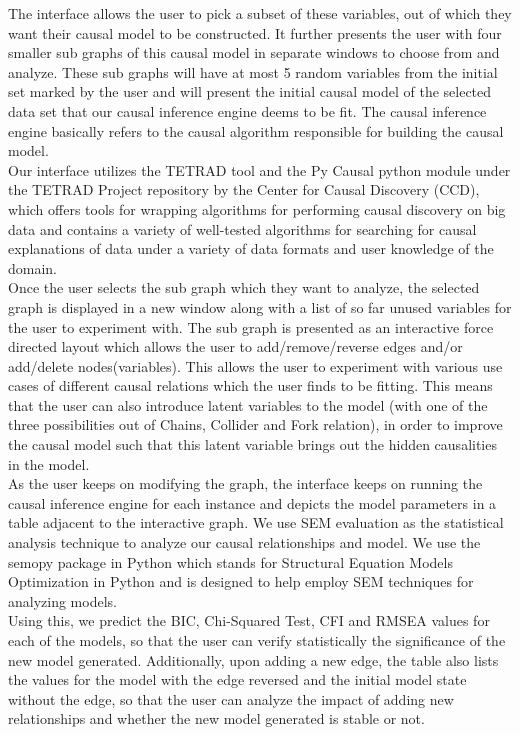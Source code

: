 \documentclass{vgtc}                          %
\begin{document}
The interface allows the user to pick a subset of these variables, out of which they want their causal model to be constructed. It further presents the user with four smaller sub graphs of this causal model in separate windows to choose from and analyze. These sub graphs will have at  most 5 random variables from the initial set marked by the user and will present the initial causal model of the selected data set that our causal inference engine deems to be fit. The causal inference engine basically refers to the causal algorithm responsible for building the causal model.
\\[0.5em]
Our interface utilizes the TETRAD tool and the Py Causal python module under the TETRAD Project repository by the Center for Causal Discovery (CCD), which offers tools for wrapping algorithms for performing causal discovery on big data and contains
a variety of well-tested algorithms for searching for causal explanations of data under a variety of data formats and user knowledge of the domain.
\\[1em]
Once the user selects the sub graph which they want to analyze, the selected graph is displayed in a new window along with a list of so far unused variables for the user to experiment with. The sub graph is presented as an interactive force directed layout which allows the user to add/remove/reverse edges and/or add/delete nodes(variables). This allows the user to experiment with various use cases of different causal relations which the user finds to be fitting. This means that the user can also introduce latent variables to the model (with one of the three possibilities out of Chains, Collider and Fork relation), in order to improve the causal model such that this latent variable brings out the hidden causalities in the model.
\\[1em]
As the user keeps on modifying the graph, the interface keeps on running the causal inference engine for each instance and depicts the model parameters in a table adjacent to the interactive graph. We use SEM evaluation as the statistical analysis technique to analyze our causal relationships and model. We use the semopy package in Python which stands for Structural Equation Models Optimization in Python and is designed to help employ SEM techniques for analyzing models. 
\\[1em]
Using this, we predict the BIC, Chi-Squared Test, CFI and RMSEA values for each of the models, so that the user can verify statistically the significance of the new model generated. Additionally, upon adding a new edge, the table also lists the values for the model with the edge reversed and the initial model state without the edge, so that the user can analyze the impact of adding new relationships and whether the new model generated is stable or not.
\end{document}
